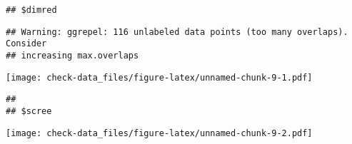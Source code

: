 \documentclass[
]{article}
\begin{document}
\begin{verbatim}
## $dimred
\end{verbatim}

\begin{verbatim}
## Warning: ggrepel: 116 unlabeled data points (too many overlaps). Consider
## increasing max.overlaps
\end{verbatim}

\texttt{[image: check-data\_files/figure-latex/unnamed-chunk-9-1.pdf]}

\begin{verbatim}
## 
## $scree
\end{verbatim}

\texttt{[image: check-data\_files/figure-latex/unnamed-chunk-9-2.pdf]}
\end{document}
